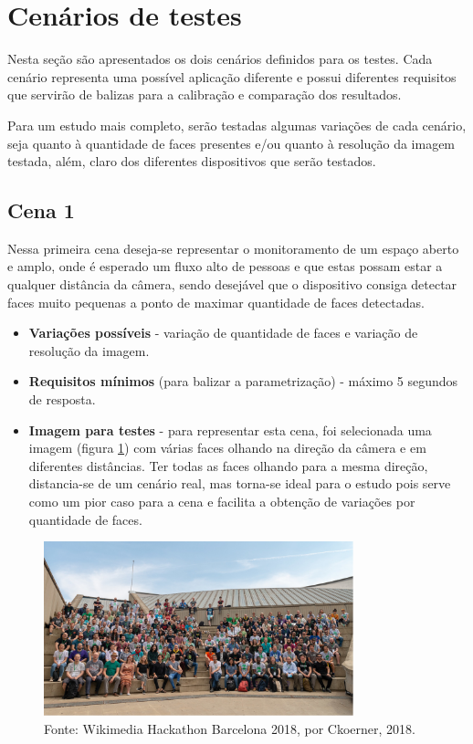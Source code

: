 \section{Cenários de testes}

Nesta seção são apresentados os dois cenários definidos para os testes. Cada cenário representa uma possível aplicação diferente e possui diferentes requisitos que servirão de balizas para a calibração e comparação dos resultados.

Para um estudo mais completo, serão testadas algumas variações de cada cenário, seja quanto à quantidade de faces presentes e/ou quanto à resolução da imagem testada, além, claro dos diferentes dispositivos que serão testados.

\subsection{Cena 1}

Nessa primeira cena deseja-se representar o monitoramento de um espaço aberto e amplo, onde é esperado um fluxo alto de pessoas e que estas possam estar a qualquer distância da câmera, sendo desejável que o dispositivo consiga detectar faces muito pequenas a ponto de maximar quantidade de faces detectadas.

\begin{itemize}
    \item \textbf{Variações possíveis} - variação de quantidade de faces e variação de resolução da imagem.
    \item \textbf{Requisitos mínimos} (para balizar a parametrização) - máximo 5 segundos de resposta.
    \item \textbf{Imagem para testes} - para representar esta cena, foi selecionada uma imagem (figura \ref{fig:imagemCena1}) com várias faces olhando na direção da câmera e em diferentes distâncias. Ter todas as faces olhando para a mesma direção, distancia-se de um cenário real, mas torna-se ideal para o estudo pois serve como um pior caso para a cena e facilita a obtenção de variações por quantidade de faces.
\end{itemize}

\begin{figure}[H]
    \centering
    \caption[Imagem selecionada para testes da cena 1.]{Imagem selecionada para testes da cena 1.}
    \includegraphics[width=0.8\textwidth]{Cap3_Desenvolvimento/Figures/imagem_cena1.jpg}
    \caption*{Fonte: Wikimedia Hackathon Barcelona 2018, por Ckoerner, 2018\footnotemark.}
    \label{fig:imagemCena1}
\end{figure}

